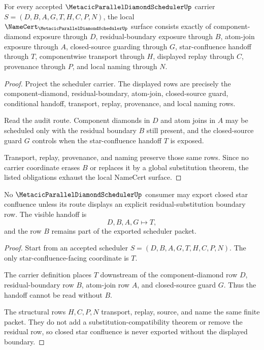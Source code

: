\begin{theorem}
\label{thm:metacic-parallel-diamond-scheduler-namecert-obligations}
For every accepted $\MetacicParallelDiamondSchedulerUp$ carrier $S=(D,B,A,G,T,H,C,P,N)$, the local $\NameCert_{\MetacicParallelDiamondSchedulerUp}$ surface consists exactly of component-diamond exposure through $D$, residual-boundary exposure through $B$, atom-join exposure through $A$, closed-source guarding through $G$, star-confluence handoff through $T$, componentwise transport through $H$, displayed replay through $C$, provenance through $P$, and local naming through $N$.
\end{theorem}
\begin{proof}
Project the scheduler carrier. The displayed rows are precisely the component-diamond, residual-boundary, atom-join, closed-source guard, conditional handoff, transport, replay, provenance, and local naming rows.

Read the audit route. Component diamonds in $D$ and atom joins in $A$ may be scheduled only with the residual boundary $B$ still present, and the closed-source guard $G$ controls when the star-confluence handoff $T$ is exposed.

Transport, replay, provenance, and naming preserve those same rows. Since no carrier coordinate erases $B$ or replaces it by a global substitution theorem, the listed obligations exhaust the local NameCert surface.
\end{proof}

\begin{theorem}
\label{thm:metacic-parallel-diamond-scheduler-residual-boundary}
No $\MetacicParallelDiamondSchedulerUp$ consumer may export closed star confluence unless its route displays an explicit residual-substitution boundary row. The visible handoff is
$$
D,B,A,G \longmapsto T,
$$
and the row $B$ remains part of the exported scheduler packet.
\end{theorem}
\begin{proof}
Start from an accepted scheduler $S=(D,B,A,G,T,H,C,P,N)$. The only star-confluence-facing coordinate is $T$.

The carrier definition places $T$ downstream of the component-diamond row $D$, residual-boundary row $B$, atom-join row $A$, and closed-source guard $G$. Thus the handoff cannot be read without $B$.

The structural rows $H,C,P,N$ transport, replay, source, and name the same finite packet. They do not add a substitution-compatibility theorem or remove the residual row, so closed star confluence is never exported without the displayed boundary.
\end{proof}

